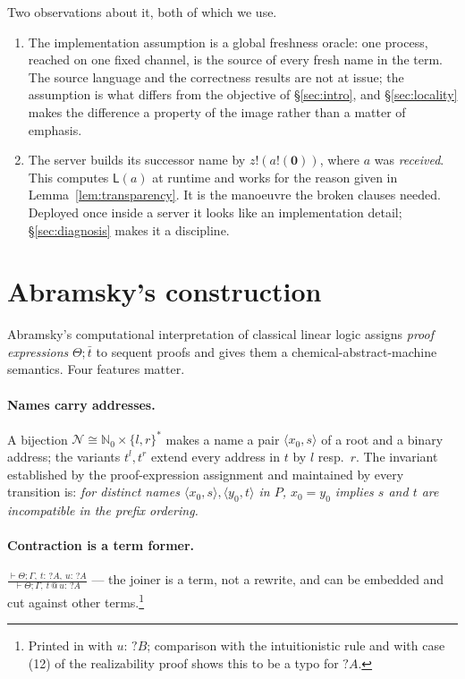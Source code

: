 \documentclass[11pt]{article}
\theoremstyle{definition}
\theoremstyle{plain}
\theoremstyle{remark}
\newcommand{\out}[2]{#1!(#2)}
\newcommand{\nil}{\mathbf{0}}
\newcommand{\Lft}{\mathsf{L}}
\begin{document}
Two observations about it, both of which we use.

\begin{enumerate}[label=(\arabic*),leftmargin=2.2em]
\item The implementation assumption is a global freshness oracle: one
process, reached on one fixed channel, is the source of every fresh name
in the term. The source language and the correctness results are not at
issue; the assumption is what differs from the objective of
\S\ref{sec:intro}, and \S\ref{sec:locality} makes the difference a
property of the image rather than a matter of emphasis.
\item The server builds its successor name by
$\out{z}{\out{a}{\nil}}$, where $a$ was \emph{received}. This computes
$\Lft(a)$ at runtime and works for the reason given in
Lemma~\ref{lem:transparency}. It is the manoeuvre the broken clauses
needed. Deployed once inside a server it looks like an implementation
detail; \S\ref{sec:diagnosis} makes it a discipline.
\end{enumerate}

\section{Abramsky's construction}\label{sec:abramsky}

Abramsky's computational interpretation of classical linear logic
\cite{Abramsky93} assigns \emph{proof expressions} $\Theta;\bar t$ to
sequent proofs and gives them a chemical-abstract-machine semantics. Four
features matter.

\paragraph{Names carry addresses.}
A bijection $\mathcal{N} \cong \mathbb{N}_0 \times \{l,r\}^*$ makes a name
a pair $\langle x_0, s\rangle$ of a root and a binary address; the
variants $t^l, t^r$ extend every address in $t$ by $l$ resp.\ $r$. The
invariant established by the proof-expression assignment and maintained by
every transition is: \emph{for distinct names $\langle x_0,s\rangle,
\langle y_0,t\rangle$ in $P$, $x_0 = y_0$ implies $s$ and $t$ are
incompatible in the prefix ordering.}

\paragraph{Contraction is a term former.}
$\displaystyle
\frac{\vdash \Theta; \Gamma,\ t{:}\,?A,\ u{:}\,?A}
     {\vdash \Theta; \Gamma,\ t \mathbin{@} u : \,?A}$
--- the joiner is a term, not a rewrite, and can be embedded and cut
against other terms.\footnote{Printed in \cite{Abramsky93} with $u{:}\,?B$;
comparison with the intuitionistic rule and with case (12) of the
realizability proof shows this to be a typo for $?A$.}
\end{document}
